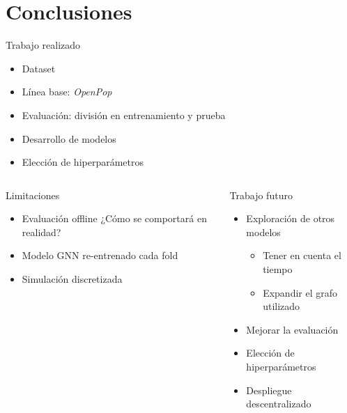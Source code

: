 \section{Conclusiones}

\begin{frame}{Trabajo realizado}
    \begin{itemize}
        \item Dataset
        \item Línea base: \textit{OpenPop}
        \item Evaluación: división en entrenamiento y prueba
        \item Desarrollo de modelos
        \item Elección de hiperparámetros
    \end{itemize}
\end{frame}

\begin{frame}
    \begin{columns}
        \begin{alertblock}{Limitaciones}
            \begin{itemize}
                \item Evaluación offline \textrightarrow ¿Cómo se comportará en realidad?
                \item Modelo GNN re-entrenado cada fold
                \item Simulación discretizada
            \end{itemize} 
        \end{alertblock}
        \pause
        \begin{exampleblock}{Trabajo futuro}
            \begin{itemize}
                \item Exploración de otros modelos
                \begin{itemize}
                    \item Tener en cuenta el tiempo
                    \item Expandir el grafo utilizado
                \end{itemize}
                \item Mejorar la evaluación
                \item Elección de hiperparámetros
                \item Despliegue descentralizado\footnotemark
            \end{itemize}
        \end{exampleblock}
    \end{columns}
\end{frame}


